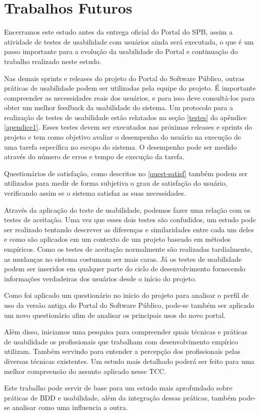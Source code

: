 \section{Trabalhos Futuros}

Encerramos este estudo antes da entrega oficial do Portal do SPB, assim a atividade de testes de usabilidade com usuários ainda será executada, o que é um passo importante para a evolução da usabilidade do Portal e continuação do trabalho realizado neste estudo.

Nas demais sprints e releases do projeto do Portal do Software Público, outras práticas de usabilidade podem ser utilizadas pela equipe do projeto. É importante compreender as necessidades reais dos usuários, e para isso deve consultá-los para obter um melhor feedback da usabilidade do sistema. Um protocolo para a realização de testes de usabilidade estão relatados na seção \ref{testes} do apêndice \ref{apendice1}. Esses testes devem ser executados nas próximas releases e sprints do projeto e tem como objetivo avaliar o desempenho do usuário na execução de uma tarefa específica no escopo do sistema. O desempenho pode ser medido através do número de erros e tempo de execução da tarefa. 

Questionários de satisfação, como descritos no \ref{quest-satisf} também podem ser utilizados para medir de forma subjetiva o grau de satisfação do usuário, verificando assim se o sistema satisfaz as suas necessidades.

Através da aplicação do teste de usabilidade, podemos fazer uma relação com os testes de aceitação. Uma vez que esses dois testes são confudidos, um estudo pode ser realizado tentando descrever as diferenças e similaridades entre cada um deles e como são aplicados em um contexto de um projeto baseado em métodos empíricos. Como os testes de aceitação normalmente são realizadas tardialmente, as mudanças no sistema costumam ser mais caras. Já os testes de usabilidade podem ser inseridos em qualquer parte do ciclo de desenvolvimento fornecendo informações verdadeiras dos usuários desde o início do projeto.

Como foi aplicado um questionário no inicio do projeto para analisar o perfil de uso da versão antiga do Portal do Software Público, pode-se também ser aplicado um novo questionário afim de analisar os principais usos do novo portal.

Além disso, iniciamos uma pesquisa para compreender quais técnicas e práticas de usabilidade os profissionais que trabalham com desenvolvimento empírico utilizam. Também servindo para entender a percepção dos profissionais pelas diversas técnicas existentes. Um estudo mais detalhado poderá ser feito para uma melhor compreensão do assunto aplicado nesse TCC. 

Este trabalho pode servir de base para um estudo mais aprofundado sobre práticas de BDD e usabilidade, além da integração dessas práticas, também pode-se analisar como uma influencia a outra.
